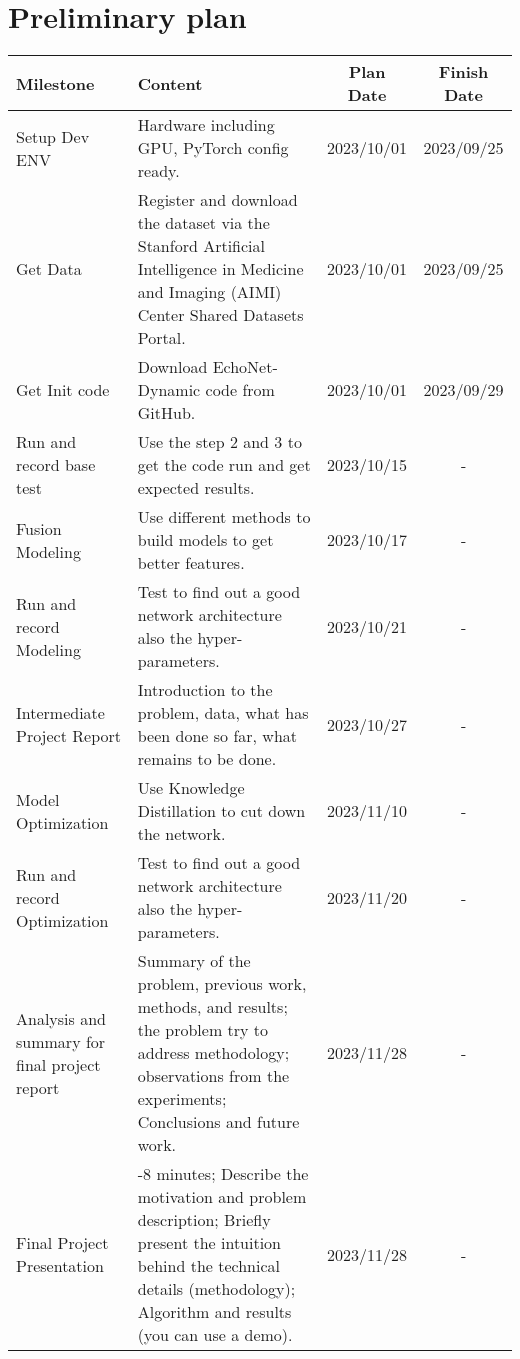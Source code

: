 \section{Preliminary plan}
\label{sec:formatting}

\noindent
\begin{minipage}{0.5\textwidth}
    \fontsize{7}{10}\selectfont
    \begin{tabular}{|>{\raggedright\arraybackslash}m{1cm}|>{\raggedright\arraybackslash}m{3cm}|c|c|}
        \hline
        \rowcolor{myblue} \color{white} Milestone & \color{white} Content & \color{white} Plan Date & \color{white} Finish Date \\
        \hline
        Setup Dev ENV & Hardware including GPU, PyTorch config ready. & 2023/10/01 & 2023/09/25\\
        \hline
        Get Data & Register and download the dataset via the Stanford Artificial Intelligence in Medicine and Imaging (AIMI) Center Shared Datasets Portal. & 2023/10/01 & 2023/09/25\\
        \hline
        Get Init code & Download EchoNet-Dynamic code from GitHub. & 2023/10/01 & 2023/09/29\\
        \hline
        Run and record base test & Use the step 2 and 3 to get the code run and get expected results. & 2023/10/15 & -\\
        \hline
        Fusion Modeling & Use different methods to build models to get better features. & 2023/10/17 & -\\
        \hline
        Run and record Modeling & Test to find out a good network architecture also the hyper-parameters. & 2023/10/21 & -\\
        \hline
        Intermediate Project Report & Introduction to the problem, data, what has been done so far, what remains to be done. & 2023/10/27 & -\\
        \hline
        Model Optimization & Use Knowledge Distillation to cut down the network. & 2023/11/10 & -\\
        \hline
        Run and record Optimization & Test to find out a good network architecture also the hyper-parameters. & 2023/11/20 & -\\
        \hline
        Analysis and summary for final project report & Summary of the problem, previous work, methods, and results; the problem try to address methodology; observations from the experiments; Conclusions and future work. & 2023/11/28 & -\\
        \hline
        Final Project Presentation & 5-8 minutes; Describe the motivation and problem description; Briefly present the intuition behind the technical details (methodology); Algorithm and results (you can use a demo). & 2023/11/28 & -\\
        \hline
    \end{tabular}
\end{minipage}%